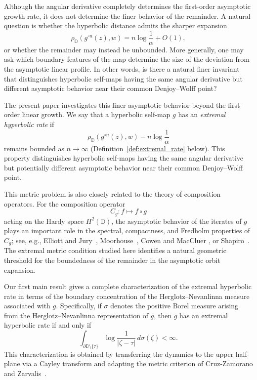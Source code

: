 \documentclass[12pt]{amsart}
\numberwithin{equation}{section}
\theoremstyle{plain}
\theoremstyle{definition}
\begin{document}
Although the angular derivative completely determines the first-order
asymptotic growth rate, it does not determine the finer behavior of the
remainder. A natural question is whether the hyperbolic distance admits
the sharper expansion
\begin{equation*}
\rho_{\mathbb D}(g^{\circ n}(z),w)
=
n\log\frac1\alpha+O(1),
\end{equation*}
or whether the remainder may instead be unbounded. More generally, one
may ask which boundary features of the map determine the size of the
deviation from the asymptotic linear profile. In other words, is there a
natural finer invariant that distinguishes hyperbolic self-maps having the
same angular derivative but different asymptotic behavior near their common
Denjoy--Wolff point?

The present paper investigates this finer asymptotic behavior beyond the
first-order linear growth. We say that a hyperbolic self-map $g$ has an
\textit{extremal hyperbolic rate} if
\begin{equation*}
\rho_{\mathbb D}(g^{\circ n}(z),w)
-
n\log\frac1\alpha
\end{equation*}
remains bounded as $n\to\infty$
(Definition~\ref{def:extremal_rate} below). This property distinguishes
hyperbolic self-maps having the same angular derivative but potentially
different asymptotic behavior near their common Denjoy--Wolff point.

This metric problem is also closely related to the theory of composition
operators. For the composition operator
\begin{equation*}
C_g:f\mapsto f\circ g
\end{equation*}
acting on the Hardy space $H^2(\mathbb D)$, the asymptotic behavior of the
iterates of $g$ plays an important role in the spectral, compactness, and
Fredholm properties of $C_g$; see, e.g.,
Elliott and Jury~\cite{elliott}, Moorhouse~\cite{moor}, Cowen and MacCluer
\cite[Chapter~7]{CowenMacCluer}, or
Shapiro~\cite[Chapter~5]{Shapiro}. The extremal metric condition studied
here identifies a natural geometric threshold for the boundedness of the
remainder in the asymptotic orbit expansion.

Our first main result gives a complete characterization of the extremal
hyperbolic rate in terms of the boundary concentration of the
Herglotz--Nevanlinna measure associated with $g$. Specifically, if
$\sigma$ denotes the positive Borel measure arising from the
Herglotz--Nevanlinna representation of $g$, then $g$ has an extremal
hyperbolic rate if and only if
\begin{equation}
\label{eq:intro_logmoment}
\int_{\partial\mathbb D\setminus\{\tau\}}
\log\frac1{|\zeta-\tau|}
\,d\sigma(\zeta)
<
\infty.
\end{equation}
This characterization is obtained by transferring the dynamics to the
upper half-plane via a Cayley transform and adapting the metric criterion
of Cruz-Zamorano and Zarvalis~\cite[Theorem~4.4]{cruz}.
\end{document}
